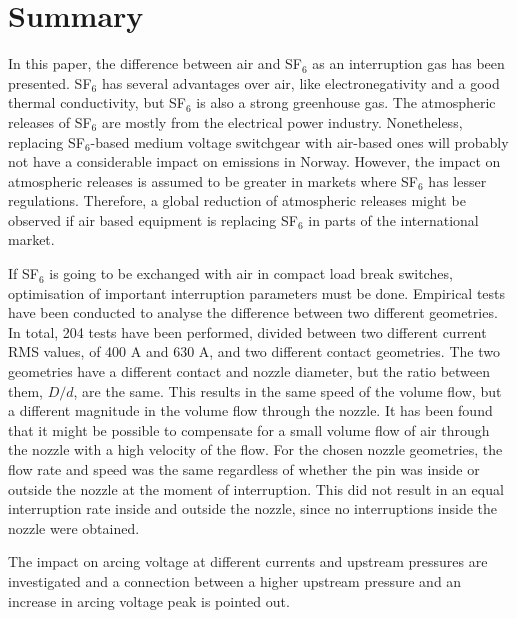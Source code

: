 \documentclass[10pt,a4paper,twoside]{article}
\begin{document}
\thispagestyle{empty}
\cleardoublepage

\section*{Summary}
\setcounter{page}{1}

In this paper, the difference between air and SF$_6$ as an interruption gas has been presented. SF$_6$ has several advantages over air, like electronegativity and a good thermal conductivity, but SF$_6$ is also a strong greenhouse gas. The atmospheric releases of SF$_6$ are mostly from the electrical power industry. Nonetheless, replacing SF$_6$-based medium voltage switchgear with air-based ones will probably not have a considerable impact on emissions in Norway. However, the impact on atmospheric releases is assumed to be greater in markets where SF$_6$ has lesser regulations. Therefore, a global reduction of atmospheric releases might be observed if air based equipment is replacing SF$_6$ in parts of the international market.  

If SF$_6$ is going to be exchanged with air in compact load break switches, optimisation of important interruption parameters must be done. Empirical tests have been conducted to analyse the difference between two different geometries. In total, 204 tests have been performed, divided between two different current RMS values, of 400 A and 630 A, and two different contact geometries. The two geometries have a different contact and nozzle diameter, but the ratio between them, $D/d$, are the same. This results in the same speed of the volume flow, but a different magnitude in the volume flow through the nozzle. It has been found that it might be possible to compensate for a small volume flow of air through the nozzle with a high velocity of the flow. For the chosen nozzle geometries, the flow rate and speed was the same regardless of whether the pin was inside or outside the nozzle at the moment of interruption. This did not result in an equal interruption rate inside and outside the nozzle, since no interruptions inside the nozzle were obtained.

The impact on arcing voltage at different currents and upstream pressures are investigated and a connection between a higher upstream pressure and an increase in arcing voltage peak is pointed out.
\end{document}
